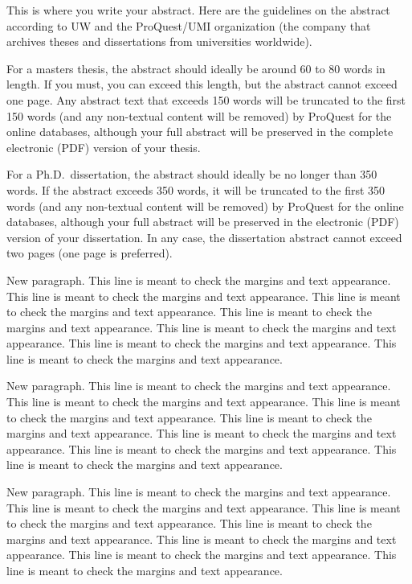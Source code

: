 \documentclass[12pt]{book}                  %
\begin{document}

\thesisCommitteePage

\begin{thesisabstract}
This is where you write your abstract.  Here are the guidelines on
the abstract according to UW and the
ProQuest/UMI organization (the company that archives theses and dissertations from
universities worldwide).


For a masters thesis, the abstract should ideally be around 60 to 80
words in length.  If you must, you can exceed this length, but the
abstract cannot exceed one page.  Any abstract text that exceeds
150 words will be truncated to the first 150 words (and any non-textual content will
be removed) by ProQuest for the online databases, although your full abstract will
be preserved in the complete electronic (PDF) version of your thesis.


For a Ph.D.\ dissertation, the abstract should ideally be no longer than 350 words. If
the abstract exceeds 350 words, it will be truncated to the first 350 words (and any
non-textual content will be removed) by ProQuest for the online databases, although your
full abstract will be preserved in the electronic (PDF) version of your dissertation. In
any case, the dissertation abstract cannot exceed two pages (one page is preferred).

New paragraph. This line is meant to check the margins and text
appearance. This line is meant to check the margins and text
appearance. This line is meant to check the margins and text
appearance. This line is meant to check the margins and text
appearance. This line is meant to check the margins and text
appearance. This line is meant to check the margins and text
appearance. This line is meant to check the margins and text
appearance.

New paragraph. This line is meant to check the margins and text
appearance. This line is meant to check the margins and text
appearance. This line is meant to check the margins and text
appearance. This line is meant to check the margins and text
appearance. This line is meant to check the margins and text
appearance. This line is meant to check the margins and text
appearance. This line is meant to check the margins and text
appearance.

New paragraph. This line is meant to check the margins and text
appearance. This line is meant to check the margins and text
appearance. This line is meant to check the margins and text
appearance. This line is meant to check the margins and text
appearance. This line is meant to check the margins and text
appearance. This line is meant to check the margins and text
appearance. This line is meant to check the margins and text
appearance.



\end{thesisabstract}
\end{document}

